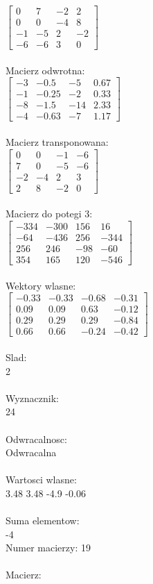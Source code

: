 \documentclass[a4paper,12pt]{article}
\begin{document}
$\begin{bmatrix} 0&7&-2&2\\0&0&-4&8\\-1&-5&2&-2\\-6&-6&3&0 \end{bmatrix}$
\\
\\
Macierz odwrotna:\\

$\begin{bmatrix} -3&-0.5&-5&0.67\\-1&-0.25&-2&0.33\\-8&-1.5&-14&2.33\\-4&-0.63&-7&1.17 \end{bmatrix}$
\\
\\
Macierz transponowana:\\

$\begin{bmatrix} 0&0&-1&-6\\7&0&-5&-6\\-2&-4&2&3\\2&8&-2&0 \end{bmatrix}$
\\
\\
Macierz do potegi 3:\\

$\begin{bmatrix} -334&-300&156&16\\-64&-436&256&-344\\256&246&-98&-60\\354&165&120&-546 \end{bmatrix}$
\\
\\
Wektory wlasne:\\

$\begin{bmatrix} -0.33&-0.33&-0.68&-0.31\\0.09&0.09&0.63&-0.12\\0.29&0.29&0.29&-0.84\\0.66&0.66&-0.24&-0.42 \end{bmatrix}$
\\
\\
Slad:\\
2
\\
\\
Wyznacznik:\\
24
\\
\\
Odwracalnosc:\\
Odwracalna
\\
\\
Wartosci wlasne:\\
3.48 3.48 -4.9 -0.06
\\
\\
Suma elementow:\\
-4
\\
\newpage
Numer macierzy:
19
\\
\\
Macierz:\\
\end{document}
